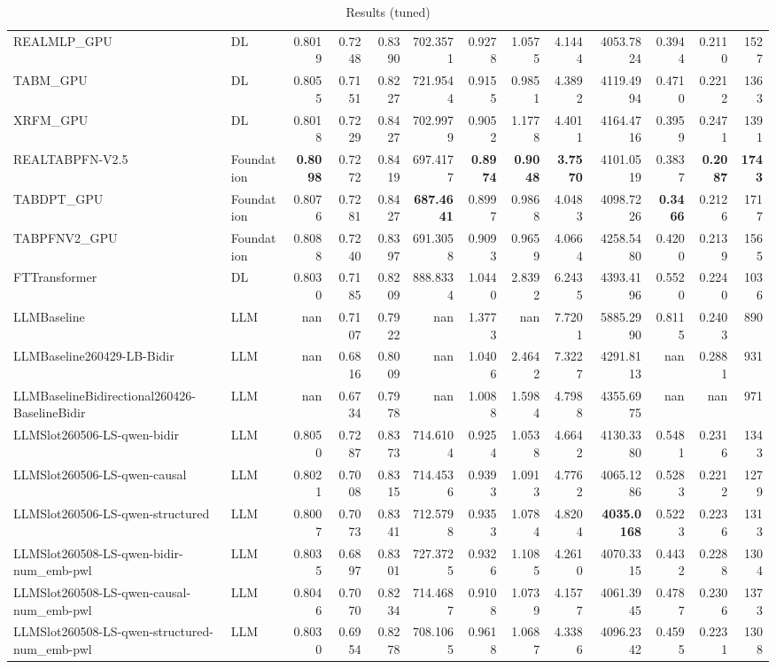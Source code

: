 \begin{table}[htbp]
{\begin{tabular}{ll|rrrrrrrrrr|r}
REALMLP\_GPU & DL & 0.8019 & 0.7248 & 0.8390 & 702.3571 & 0.9278 & 1.0575 & 4.1444 & 4053.7824 & 0.3944 & 0.2110 & 1527 \\
TABM\_GPU & DL & 0.8055 & 0.7151 & 0.8227 & 721.9544 & 0.9155 & 0.9851 & 4.3892 & 4119.4994 & 0.4710 & 0.2212 & 1363 \\
XRFM\_GPU & DL & 0.8018 & 0.7229 & 0.8427 & 702.9979 & 0.9052 & 1.1778 & 4.4011 & 4164.4716 & 0.3959 & 0.2471 & 1391 \\
REALTABPFN-V2.5 & Foundation & \textbf{0.8098} & 0.7272 & 0.8419 & 697.4177 & \textbf{0.8974} & \textbf{0.9048} & \textbf{3.7570} & 4101.0519 & 0.3837 & \textbf{0.2087} & \textbf{1743} \\
TABDPT\_GPU & Foundation & 0.8076 & 0.7281 & 0.8427 & \textbf{687.4641} & 0.8997 & 0.9868 & 4.0483 & 4098.7226 & \textbf{0.3466} & 0.2126 & 1717 \\
TABPFNV2\_GPU & Foundation & 0.8088 & 0.7240 & 0.8397 & 691.3058 & 0.9093 & 0.9659 & 4.0664 & 4258.5480 & 0.4200 & 0.2139 & 1565 \\
\midrule
FTTransformer & DL & 0.8030 & 0.7185 & 0.8209 & 888.8334 & 1.0440 & 2.8392 & 6.2435 & 4393.4196 & 0.5520 & 0.2240 & 1036 \\
LLMBaseline & LLM & nan & 0.7107 & 0.7922 & nan & 1.3773 & nan & 7.7201 & 5885.2990 & 0.8115 & 0.2403 & 890 \\
LLMBaseline260429-LB-Bidir & LLM & nan & 0.6816 & 0.8009 & nan & 1.0406 & 2.4642 & 7.3227 & 4291.8113 & nan & 0.2881 & 931 \\
LLMBaselineBidirectional260426-BaselineBidir & LLM & nan & 0.6734 & 0.7978 & nan & 1.0088 & 1.5984 & 4.7988 & 4355.6975 & nan & nan & 971 \\
LLMSlot260506-LS-qwen-bidir & LLM & 0.8050 & 0.7287 & 0.8373 & 714.6104 & 0.9254 & 1.0538 & 4.6642 & 4130.3380 & 0.5481 & 0.2316 & 1343 \\
LLMSlot260506-LS-qwen-causal & LLM & 0.8021 & 0.7008 & 0.8315 & 714.4536 & 0.9393 & 1.0913 & 4.7762 & 4065.1286 & 0.5283 & 0.2212 & 1279 \\
LLMSlot260506-LS-qwen-structured & LLM & 0.8007 & 0.7073 & 0.8341 & 712.5798 & 0.9353 & 1.0784 & 4.8204 & \textbf{4035.0168} & 0.5223 & 0.2236 & 1313 \\
LLMSlot260508-LS-qwen-bidir-num\_emb-pwl & LLM & 0.8035 & 0.6897 & 0.8301 & 727.3725 & 0.9326 & 1.1085 & 4.2610 & 4070.3315 & 0.4432 & 0.2288 & 1304 \\
LLMSlot260508-LS-qwen-causal-num\_emb-pwl & LLM & 0.8046 & 0.7070 & 0.8234 & 714.4687 & 0.9108 & 1.0739 & 4.1577 & 4061.3945 & 0.4787 & 0.2306 & 1373 \\
LLMSlot260508-LS-qwen-structured-num\_emb-pwl & LLM & 0.8030 & 0.6954 & 0.8278 & 708.1065 & 0.9618 & 1.0687 & 4.3386 & 4096.2342 & 0.4595 & 0.2231 & 1308 \\
\bottomrule
\end{tabular}
}
\caption{Results (tuned)}
\label{tab:results_tuned}
\end{table}